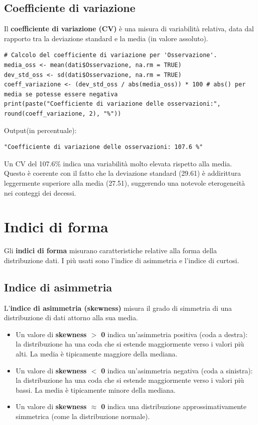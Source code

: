 \documentclass[14pt, openany, titlepage]{report} %
\begin{document}
\section{Coefficiente di variazione}
Il \textbf{coefficiente di variazione (CV)} è una misura di variabilità relativa,
 data dal rapporto tra la deviazione standard e la media (in valore assoluto).
\begin{center}
\begin{lstlisting}[breaklines=true]
# Calcolo del coefficiente di variazione per 'Osservazione'.
media_oss <- mean(dati$Osservazione, na.rm = TRUE)
dev_std_oss <- sd(dati$Osservazione, na.rm = TRUE)
coeff_variazione <- (dev_std_oss / abs(media_oss)) * 100 # abs() per media se potesse essere negativa
print(paste("Coefficiente di variazione delle osservazioni:", round(coeff_variazione, 2), "%"))
\end{lstlisting}
\end{center}
\noindent
Output(in percentuale):
\begin{verbatim}
"Coefficiente di variazione delle osservazioni: 107.6 %"
\end{verbatim}
Un CV del 107.6\% indica una variabilità molto elevata rispetto alla 
media. Questo è coerente con il fatto che la deviazione standard (29.61)
 è addirittura leggermente superiore alla media (27.51), suggerendo una
  notevole eterogeneità nei conteggi dei decessi.
\FloatBarrier


\chapter{Indici di forma}
Gli \textbf{indici di forma} misurano caratteristiche relative alla forma della distribuzione
dati. I più usati sono l'indice di asimmetria e l'indice di curtosi.

\section{Indice di asimmetria}
L'\textbf{indice di asimmetria (skewness)} misura il grado di simmetria di
 una distribuzione di dati attorno alla sua media.
\begin{itemize}
    \item Un valore di \textbf{skewness $>$ 0} indica un'asimmetria positiva (coda a destra): la distribuzione ha una coda che si estende maggiormente verso i valori più alti. La media è tipicamente maggiore della mediana.
    \item Un valore di \textbf{skewness $<$ 0} indica un'asimmetria negativa (coda a sinistra): la distribuzione ha una coda che si estende maggiormente verso i valori più bassi. La media è tipicamente minore della mediana.
    \item Un valore di \textbf{skewness $\approx$ 0} indica una distribuzione approssimativamente simmetrica (come la distribuzione normale).
\end{itemize}
\end{document}
